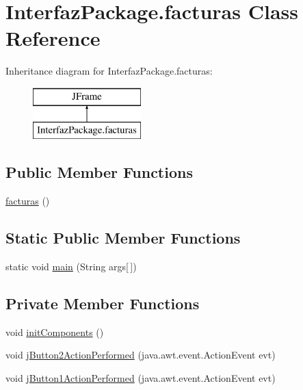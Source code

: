 \hypertarget{class_interfaz_package_1_1facturas}{}\section{Interfaz\+Package.\+facturas Class Reference}
\label{class_interfaz_package_1_1facturas}
Inheritance diagram for Interfaz\+Package.\+facturas\+:\begin{figure}[H]
\begin{center}
\leavevmode
\includegraphics[height=2.000000cm]{class_interfaz_package_1_1facturas}
\end{center}
\end{figure}
\subsection*{Public Member Functions}
\begin{DoxyCompactItemize}
\item 
\mbox{\hyperlink{class_interfaz_package_1_1facturas_a14c886b63fc2b58e9f9b6697daa99c6b}{facturas}} ()
\end{DoxyCompactItemize}
\subsection*{Static Public Member Functions}
\begin{DoxyCompactItemize}
\item 
static void \mbox{\hyperlink{class_interfaz_package_1_1facturas_a27653f6f8bf303404e4f16dd03c1ef7b}{main}} (String args\mbox{[}$\,$\mbox{]})
\end{DoxyCompactItemize}
\subsection*{Private Member Functions}
\begin{DoxyCompactItemize}
\item 
void \mbox{\hyperlink{class_interfaz_package_1_1facturas_a9c7ac9a8c60637f510ef1918af149600}{init\+Components}} ()
\item 
void \mbox{\hyperlink{class_interfaz_package_1_1facturas_a023cec016c322f3d44297ce73f0e70e6}{j\+Button2\+Action\+Performed}} (java.\+awt.\+event.\+Action\+Event evt)
\item 
void \mbox{\hyperlink{class_interfaz_package_1_1facturas_a46e4e792f309129dc699c57b1cc16d64}{j\+Button1\+Action\+Performed}} (java.\+awt.\+event.\+Action\+Event evt)
\end{DoxyCompactItemize}
